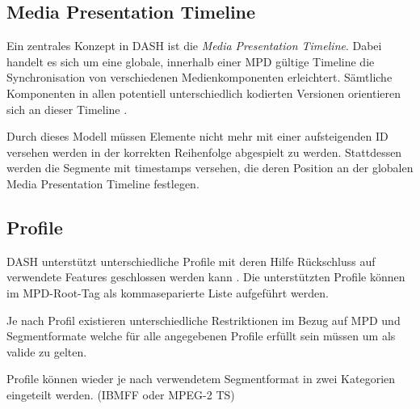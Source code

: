 \documentclass[paper = a4, fontsize = 12pt, parskip = half]{scrartcl} %
\begin{document}
\subsection{Media Presentation Timeline}
Ein zentrales Konzept in DASH ist die \textit{Media Presentation Timeline}. Dabei handelt es sich um eine globale, innerhalb einer MPD gültige Timeline die Synchronisation von verschiedenen Medienkomponenten erleichtert. Sämtliche Komponenten in allen potentiell unterschiedlich kodierten Versionen orientieren sich an dieser Timeline \cite{international_organization_for_standardization_isoiec_nodate}.

Durch dieses Modell müssen Elemente nicht mehr mit einer aufsteigenden ID versehen werden in der korrekten Reihenfolge abgespielt zu werden. Stattdessen werden die Segmente mit timestamps versehen, die deren Position an der globalen Media Presentation Timeline festlegen.


\subsection{Profile}
\label{profiles}
DASH unterstützt unterschiedliche Profile mit deren Hilfe Rückschluss auf verwendete Features geschlossen werden kann \cite{international_organization_for_standardization_isoiec_nodate}. Die unterstützten Profile können im MPD-Root-Tag als kommaseparierte Liste aufgeführt werden.

Je nach Profil existieren unterschiedliche Restriktionen im Bezug auf MPD und Segmentformate welche für alle angegebenen Profile erfüllt sein müssen um als valide zu gelten.

Profile können wieder je nach verwendetem Segmentformat in zwei Kategorien eingeteilt werden. (IBMFF oder MPEG-2 TS)
\end{document}
